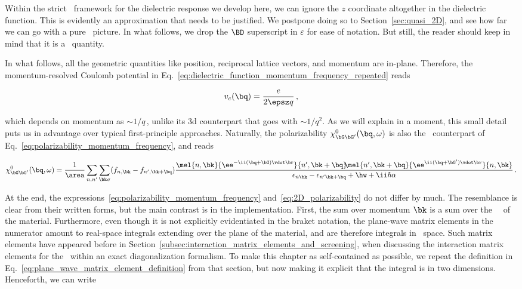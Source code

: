 Within the strict \bd~framework for the dielectric response we develop here, we can ignore the $z$ coordinate altogether in the dielectric function.
This is evidently an approximation that needs to be justified.
We postpone doing so to Section~\ref{sec:quasi_2D}, and see how far we can go with a pure \bd~picture.
In what follows, we drop the $\BD$ superscript in $\varepsilon$ for ease of notation.
But still, the reader should keep in mind that it is a \bd~quantity.

In what follows, all the geometric quantities like position, reciprocal lattice vectors, and momentum are in-plane.
Therefore, the momentum-resolved Coulomb potential in Eq.~\eqref{eq:dielectric_function_momentum_frequency_repeated} reads

\begin{equation}
    \label{eq:coulomb_momentum_repeated}
    v_c(\bq) =  \frac{e}{2  \epsz q} \,,
\end{equation}

\noindent which depends on momentum as $\sim 1/q$\,, unlike its \gls{3d} counterpart that goes with $\sim 1/q^2$.
As we will explain in a moment, this small detail puts us in advantage over typical first-principle approaches.
Naturally, the polarizability $\chi^0_{\bG \bG'} (\bq,\omega)$ is also the \bd~counterpart of Eq.~\eqref{eq:polarizability_momentum_frequency}, and reads

\begin{equation}
\label{eq:2D_polarizability}
    \chi^0_{\bG \bG'} (\bq,\omega) = \frac{1}{\area} \sum_{n,n'} \sum_{\bk \sigma} (f_{n,\bk} - f_{n',\bk + \bq}) \frac{\mel{n,\bk}{\ee^{-\ii(\bq + \bG) \vdot \br}}{n',\bk + \bq} \! \! \mel{n',\bk + \bq}{\ee^{\ii(\bq + \bG') \vdot \br}}{n,\bk}}{\epsilon_{n \bk} - \epsilon_{n' \bk + \bq} + \hw + \ii \hbar \alpha}\,.
\end{equation}

\noindent At the end, the expressions~\eqref{eq:polarizability_momentum_frequency} and~\eqref{eq:2D_polarizability} do not differ by much.
The resemblance is clear from their written forms, but the main contrast is in the implementation.
First, the sum over momentum $\bk$ is a sum over the \bd~\bz~of the material.
Furthermore, even though it is not explicitly evidentiated in the braket notation, the plane-wave matrix elements in the numerator amount to real-space integrals extending over the plane of the material, and are therefore integrals in \bd~space.
Such matrix elements have appeared before in Section~\ref{subsec:interaction_matrix_elements_and_screening}, when discussing the interaction matrix elements for the \bse~within an exact diagonalization formalism.
To make this chapter as self-contained as possible, we repeat the definition in Eq.~\eqref{eq:plane_wave_matrix_element_definition} from that section, but now making it explicit that the integral is in two dimensions.
Henceforth, we can write


